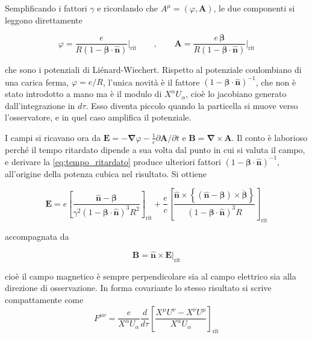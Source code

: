 Semplificando i fattori $\gamma$ e ricordando che $A^\mu = (\varphi, \mathbf{A})$, le due componenti si leggono direttamente
%
\begin{tcolorbox}[colback=black!5!white, colframe=black!45!white, boxrule=0.8pt]
\begin{equation}
    \varphi = \frac{e}{R\left(1-\boldsymbol{\beta}\cdot\hat{\mathbf{n}}\right)}\Bigg|_{\text{rit}} \qquad , \qquad \mathbf{A} = \frac{e\,\boldsymbol{\beta}}{R\left(1-\boldsymbol{\beta}\cdot\hat{\mathbf{n}}\right)}\Bigg|_{\text{rit}}
    \label{eq:lienard_wiechert}
\end{equation}
\end{tcolorbox}
che sono i potenziali di Liénard-Wiechert. Rispetto al potenziale coulombiano di una carica ferma, $\varphi = e/R$, l'unica novità è il fattore $(1-\boldsymbol{\beta}\cdot\hat{\mathbf{n}})^{-1}$, che non è stato introdotto a mano ma è il modulo di $X^\alpha U_\alpha$, cioè lo jacobiano generato dall'integrazione in $d\tau$. Esso diventa piccolo quando la particella si muove verso l'osservatore, e in quel caso amplifica il potenziale.

I campi si ricavano ora da $\mathbf{E} = -\boldsymbol{\nabla}\varphi - \frac{1}{c}\partial\mathbf{A}/\partial t$ e $\mathbf{B} = \boldsymbol{\nabla}\times\mathbf{A}$. Il conto è laborioso perché il tempo ritardato dipende a sua volta dal punto in cui si valuta il campo, e derivare la \eqref{eq:tempo_ritardato} produce ulteriori fattori $(1-\boldsymbol{\beta}\cdot\hat{\mathbf{n}})^{-1}$, all'origine della potenza cubica nel risultato. Si ottiene
%
\begin{tcolorbox}[colback=black!5!white, colframe=black!45!white, boxrule=0.8pt]
\begin{equation}
    \mathbf{E} = e\left[\frac{\hat{\mathbf{n}}-\boldsymbol{\beta}}{\gamma^2\left(1-\boldsymbol{\beta}\cdot\hat{\mathbf{n}}\right)^3 R^2}\right]_{\text{rit}} + \frac{e}{c}\left[\frac{\hat{\mathbf{n}}\times\left\{\left(\hat{\mathbf{n}}-\boldsymbol{\beta}\right)\times\dot{\boldsymbol{\beta}}\right\}}{\left(1-\boldsymbol{\beta}\cdot\hat{\mathbf{n}}\right)^3 R}\right]_{\text{rit}}
    \label{eq:campi_ritardati}
\end{equation}
\end{tcolorbox}
accompagnata da
\begin{tcolorbox}[colback=black!5!white, colframe=black!45!white, boxrule=0.8pt]
\begin{equation}
    \mathbf{B} = \hat{\mathbf{n}}\times\mathbf{E}\Big|_{\text{rit}}
    \label{eq:campo_magnetico_LW}
\end{equation}
\end{tcolorbox}
cioè il campo magnetico è sempre perpendicolare sia al campo elettrico sia alla direzione di osservazione. In forma covariante lo stesso risultato si scrive compattamente come
%
\begin{equation}
    F^{\mu\nu} = \frac{e}{X^\alpha U_\alpha}\frac{d}{d\tau}\left[\frac{X^\mu U^\nu - X^\nu U^\mu}{X^\alpha U_\alpha}\right]_{\text{rit}}
    \label{eq:tensore_LW}
\end{equation}

